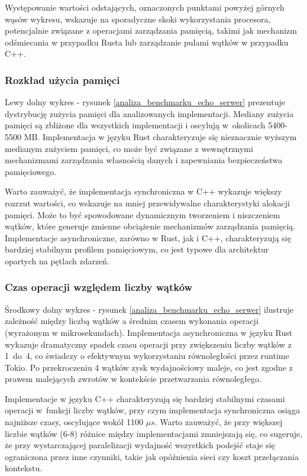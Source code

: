 Występowanie wartości odstających, oznaczonych punktami powyżej górnych wąsów wykresu, wskazuje na sporadyczne skoki wykorzystania procesora, potencjalnie związane z operacjami zarządzania pamięcią, takimi jak mechanizm odśmiecania w przypadku Rusta lub zarządzanie pulami wątków w przypadku C++.

\subsubsection{Rozkład użycia pamięci}
Lewy dolny wykres - rysunek \ref{analiza_benchmarku_echo_serwer} prezentuje dystrybucję zużycia pamięci dla analizowanych implementacji. Mediany zużycia pamięci są zbliżone dla wszystkich implementacji i oscylują w~okolicach 5400-5500 MB. Implementacja w języku Rust charakteryzuje się nieznacznie wyższym medianym zużyciem pamięci, co może być związane z wewnętrznymi mechanizmami zarządzania własnością danych i zapewniania bezpieczeństwa pamięciowego.

Warto zauważyć, że implementacja synchroniczna w C++ wykazuje większy rozrzut wartości, co wskazuje na mniej przewidywalne charakterystyki alokacji pamięci. Może to być spowodowane dynamicznym tworzeniem i niszczeniem wątków, które generuje zmienne obciążenie mechanizmów zarządzania pamięcią. Implementacje asynchroniczne, zarówno w Rust, jak i C++, charakteryzują się bardziej stabilnym profilem pamięciowym, co jest typowe dla architektur opartych na pętlach zdarzeń.

\subsubsection{Czas operacji względem liczby wątków}
Środkowy dolny wykres - rysunek \ref{analiza_benchmarku_echo_serwer} ilustruje zależność między liczbą wątków a średnim czasem wykonania operacji (wyrażonym w mikrosekundach). Implementacja asynchroniczna w języku Rust wykazuje dramatyczny spadek czasu operacji przy zwiększeniu liczby wątków z \mbox{1 do 4}, co świadczy o efektywnym wykorzystaniu równoległości przez runtime Tokio. Po przekroczeniu 4 wątków zysk wydajnościowy maleje, co jest zgodne z prawem malejących zwrotów w kontekście przetwarzania równoległego.

Implementacje w języku C++ charakteryzują się bardziej stabilnymi czasami operacji w~funkcji liczby wątków, przy czym implementacja synchroniczna osiąga najniższe czasy, oscylujące wokół 1100 $\mu s$. Warto zauważyć, że przy większej liczbie wątków (6-8) różnice między implementacjami zmniejszają się, co sugeruje, że przy wystarczającej paralelizacji wydajność wszystkich podejść staje się ograniczona przez inne czynniki, takie jak opóźnienia sieci czy koszt przełączania kontekstu.

